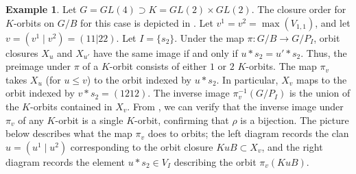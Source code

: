 \documentclass[11pt,letterpaper,reqno]{amsart}
\numberwithin{equation}{section}
\theoremstyle{plain}
\theoremstyle{definition}
\newtheorem{example}[theorem]{Example}
\theoremstyle{remark}
\begin{document}
\begin{example} \label{e:orbitnumber}
Let $G = GL(4) \supset K = GL(2) \times GL(2)$.  The closure order for $K$-orbits on $G/B$ for this case is depicted in \cite[Fig.~2]{Wys}.
Let $v^1 = v^2 = \max(V_{1,1})$, and let $v =(v^1 \mid v^2) = (1 1 | 2 2)$.
Let $I=\{s_2\}$.  Under the map $\pi: G/B \to G/P_I$, orbit closures $X_u$ and $X_{u'}$ have the same image if and only
if $u*s_2 = u'*s_2$.  Thus, the preimage under $\pi$ of a $K$-orbit consists of either $1$ or $2$ $K$-orbits.  The map $\pi_v$ takes $X_u$ (for $u \leq v$) to the orbit indexed
by $u*s_2$.  In particular, $X_v$ maps to the orbit indexed by $v*s_2 = (1 2 1 2)$.  
The inverse image $\pi_v^{-1}(G/P_I)$ is the union of the $K$-orbits contained in $X_v$.  From \cite[Fig.~2]{Wys}, we can verify that the
inverse image under $\pi_v$ of any $K$-orbit is a single $K$-orbit, confirming that $\rho$ is a bijection.  The picture below describes what the map $\pi_v$ does to orbits; the left diagram
records the clan $u = (u^1 \mid u^2)$ corresponding to the orbit closure $K u B \subset X_v$, and the right diagram records the element $u* s_2 \in V_I$
describing the orbit $\pi_v(KuB)$.

\begin{figure}[H]
\quad\begin{tikzpicture}[scale=.4] 


\end{tikzpicture}
\end{figure}
\end{example}
\end{document}
